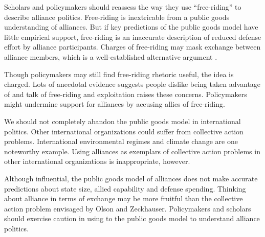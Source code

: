 \documentclass[12pt]{article}
\begin{document}
Scholars and policymakers should reassess the way they use ``free-riding'' to describe alliance politics. 
Free-riding is inextricable from a public goods understanding of alliances.
But if key predictions of the public goods model have little empirical support, free-riding is an inaccurate description of reduced defense effort by alliance participants.  
Charges of free-riding may mask exchange between alliance members, which is a well-established alternative argument \citep{Norrlof2010, Brooksetal2013, Lanoszka2015, Kim2016}. 


Though policymakers may still find free-riding rhetoric useful, the idea is charged. 
Lots of anecdotal evidence suggests people dislike being taken advantage of and talk of free-riding and exploitation raises these concerns.
Policymakers might undermine support for alliances by accusing allies of free-riding. 


We should not completely abandon the public goods model in international politics. 
Other international organizations could suffer from collective action problems.
International environmental regimes and climate change are one noteworthy example.  
Using alliances as exemplars of collective action problems in other international organizations is inappropriate, however. 


Although influential, the public goods model of alliances does not make accurate predictions about state size, allied capability and defense spending. 
Thinking about alliance in terms of exchange may be more fruitful than the collective action problem envisaged by Olson and Zeckhauser.
Policymakers and scholars should exercise caution in using to the public goods model to understand alliance politics.  



\singlespace


 
\end{document}
